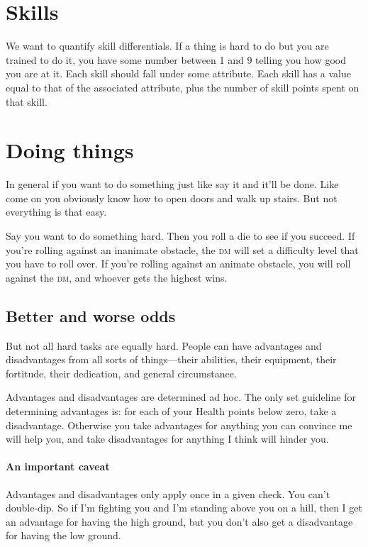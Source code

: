 \documentclass[twocolumn]{amsart}
\begin{document}
\section{Skills}\label{skills}

We want to quantify skill differentials.
If a thing is hard to do but you are trained to do it, you have some number between 1 and 9 telling you how good you are at it.
Each skill should fall under some attribute.
Each skill has a value equal to that of the associated attribute, plus the number of skill points spent on that skill.

\section{Doing things}

In general if you want to do something just like say it and it'll be done.
Like come on you obviously know how to open doors and walk up stairs.
But not everything is that easy.

Say you want to do something hard.
Then you roll a die to see if you succeed.
If you're rolling against an inanimate obstacle, the \textsc{dm} will set a difficulty level that you have to roll over.
If you're rolling against an animate obstacle, you will roll against the \textsc{dm}, and whoever gets the highest wins.

\subsection{Better and worse odds}
But not all hard tasks are equally hard.
People can have advantages and disadvantages from all sorts of things---their abilities, their equipment, their fortitude, their dedication, and general circumstance.

Advantages and disadvantages are determined ad hoc.
The only set guideline for determining advantages is: for each of your Health points below zero, take a disadvantage.
Otherwise you take advantages for anything you can convince me will help you, and take disadvantages for anything I think will hinder you.

\paragraph{An important caveat}
Advantages and disadvantages only apply once in a given check.
You can't double-dip.
So if I'm fighting you and I'm standing above you on a hill, then I get an advantage for having the high ground, but you don't also get a disadvantage for having the low ground.
\end{document}

